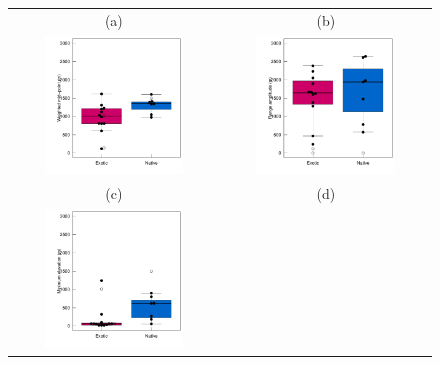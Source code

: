 \documentclass{article}
\begin{document}
\begin{figure}
\hspace{-2cm}
\begin{tabular}{cc}
(a) & (b) \\
\includegraphics[width=0.7\textwidth]{figures/zoizos-boxwmalt}&
\includegraphics[width=0.7\textwidth]{figures/zoizos-boxampl}\\
(c) & (d) \\
\includegraphics[width=0.7\textwidth]{figures/zoizos-boxmin}&

\end{tabular}
\end{figure}
\end{document}

